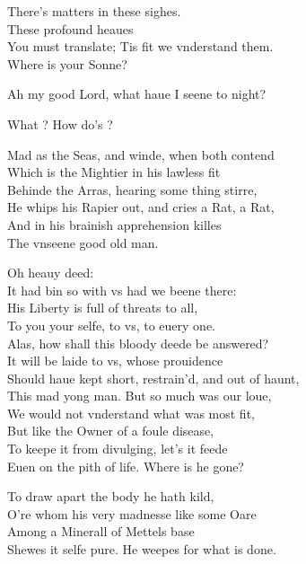 \documentclass[a5paper,DIV=calc,11pt]{scrbook}
\begin{document}
\begin{drama*}
    \kingspeaks There's matters in these sighes.\\
    These profound heaues\\
    You must translate; Tis fit we vnderstand them.\\
    Where is your Sonne?
    
    \queenspeaks Ah my good Lord, what haue I seene to night?
    
    \kingspeaks What \queen? How do's \ham?
    
    \queenspeaks Mad as the Seas, and winde, when both contend\\
    Which is the Mightier in his lawless fit\\
    Behinde the Arras, hearing some thing stirre,\\
    He whips his Rapier out, and cries a Rat, a Rat,\\
    And in his brainish apprehension killes\\
    The vnseene good old man.
    
    \kingspeaks Oh heauy deed:\\
    It had bin so with vs had we beene there:\\
    His Liberty is full of threats to all,\\
    To you your selfe, to vs, to euery one.\\
    Alas, how shall this bloody deede be answered?\\
    It will be laide to vs, whose prouidence\\
    Should haue kept short, restrain'd, and out of haunt,\\
    This mad yong man. But so much was our loue,\\
    We would not vnderstand what was most fit,\\
    But like the Owner of a foule disease,\\
    To keepe it from divulging, let's it feede\\
    Euen on the pith of life. Where is he gone?
    
    \queenspeaks To draw apart the body he hath kild,\\
    O're whom his very madnesse like some Oare\\
    Among a Minerall of Mettels base\\
    Shewes it selfe pure. He weepes for what is done.
    

\end{drama*}
\end{document}
